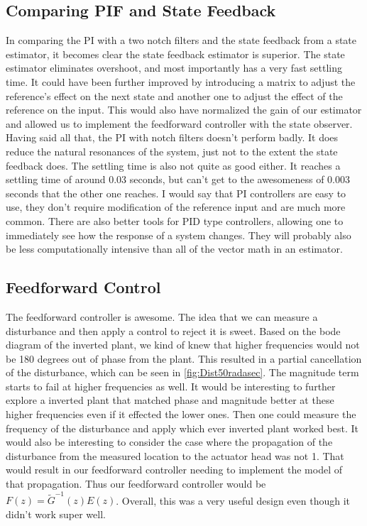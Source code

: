 \documentclass[11pt]{article}
\begin{document}
\subsection*{Comparing PIF and State Feedback}
In comparing the PI with a two notch filters and the state feedback from a state estimator, it becomes clear the state feedback estimator is superior. The state estimator eliminates overshoot, and most importantly has a very fast settling time. It could have been further improved by introducing a matrix to adjust the reference's effect on the next state and another one to adjust the effect of the reference on the input. This would also have normalized the gain of our estimator and allowed us to
implement the feedforward controller with the state observer. Having said all that, the PI with notch filters doesn't perform badly. It does reduce the natural resonances of the system, just not to the extent the state feedback does. The settling time is also not quite as good either. It reaches a settling time of around 0.03 seconds, but can't get to the awesomeness of 0.003 seconds that the other one reaches. I would say that PI controllers are easy to use, they don't require
modification of the reference input and are much more common. There are also better tools for PID type controllers, allowing one to immediately see how the response of a system changes. They will probably also be less computationally intensive than all of the vector math in an estimator.

\subsection*{Feedforward Control}
The feedforward controller is awesome. The idea that we can measure a disturbance and then apply a control to reject it is sweet. Based on the bode diagram of the inverted plant, we kind of knew that higher frequencies would not be 180 degrees out of phase from the plant. This resulted in a partial cancellation of the disturbance, which can be seen in \ref{fig:Dist50radasec}. The magnitude term starts to fail at higher frequencies as well. It would be interesting to further explore a inverted plant that matched phase and magnitude better at these higher frequencies even if it effected the lower ones. Then one could measure the frequency of the disturbance and apply which ever inverted plant worked best. It would also be interesting to consider the case where the propagation of the disturbance from the measured location to the actuator head was not 1. That would result in our feedforward controller needing to implement the model of that propagation. Thus our feedforward controller would be $F(z)=\tilde{G}^{-1}(z)E(z)$. Overall, this was a very useful design even though it didn't work super well.
\end{document}

